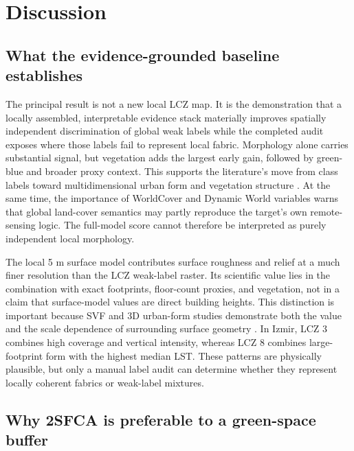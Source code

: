\section{Discussion}\label{sec:discussion}

\subsection{What the evidence-grounded baseline establishes}

The principal result is not a new local LCZ map. It is the demonstration that a
locally assembled, interpretable evidence stack materially improves
spatially independent discrimination of global weak labels while the completed
audit exposes where those labels fail to represent local fabric. Morphology
alone carries substantial signal, but vegetation adds the largest early gain,
followed by green-blue and broader proxy context. This supports the literature's
move from class labels toward multidimensional urban form and vegetation structure
\citep{zhou2022UnderstaEffects,wang2023EffectivFactors,
bai2025ImpactBuilding,yu2026UrbanMorpholo}. At the same time, the importance of
WorldCover and Dynamic World variables warns that global land-cover semantics
may partly reproduce the target's own remote-sensing logic. The full-model
score cannot therefore be interpreted as purely independent local morphology.

The local 5 m surface model contributes surface roughness and relief at a much finer
resolution than the LCZ weak-label raster. Its scientific value lies in the
combination with exact footprints, floor-count proxies, and vegetation, not in
a claim that surface-model values are direct building heights. This distinction is
important because SVF and 3D urban-form studies demonstrate both the value and
the scale dependence of surrounding surface geometry
\citep{chen2010ViewFactor,middel2018ViewFactor,
wu2025ContrastUrban,yu2026UrbanMorpholo}. In Izmir, LCZ 3 combines high coverage
and vertical intensity, whereas LCZ 8 combines large-footprint form with the
highest median LST. These patterns are physically plausible, but only a manual
label audit can determine whether they represent locally coherent fabrics or
weak-label mixtures.

\subsection{Why 2SFCA is preferable to a green-space buffer}

